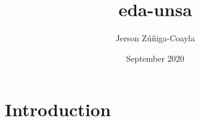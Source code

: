 \documentclass{article}
\title{eda-unsa}
\author{Jerson Zúñiga-Coayla}
\date{September 2020}
\begin{document}
\maketitle

\section{Introduction}
\end{document}
